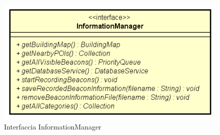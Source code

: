 \documentclass[../DefinizioneDiProdotto.tex]{subfiles}
\begin{document}
    \begin{figure}[H]
        \centering
        \includegraphics{img/InformationManager.png}
        \caption{Interfaccia InformationManager}\label{fig:model::InformationManager} 
    \end{figure}
\end{document}
